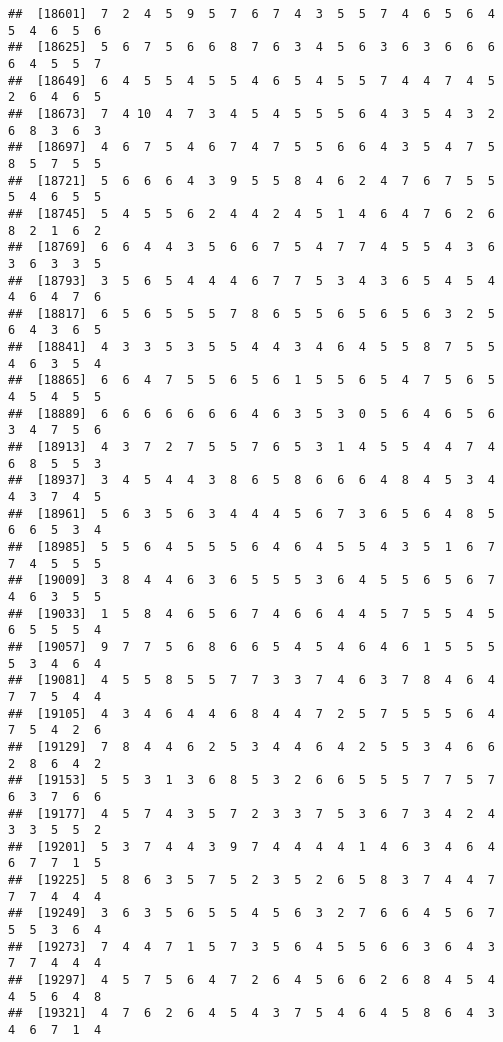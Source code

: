 \documentclass[
]{book}
\begin{document}
\begin{verbatim}
##  [18601]  7  2  4  5  9  5  7  6  7  4  3  5  5  7  4  6  5  6  4  5  4  6  5  6
##  [18625]  5  6  7  5  6  6  8  7  6  3  4  5  6  3  6  3  6  6  6  6  4  5  5  7
##  [18649]  6  4  5  5  4  5  5  4  6  5  4  5  5  7  4  4  7  4  5  2  6  4  6  5
##  [18673]  7  4 10  4  7  3  4  5  4  5  5  5  6  4  3  5  4  3  2  6  8  3  6  3
##  [18697]  4  6  7  5  4  6  7  4  7  5  5  6  6  4  3  5  4  7  5  8  5  7  5  5
##  [18721]  5  6  6  6  4  3  9  5  5  8  4  6  2  4  7  6  7  5  5  5  4  6  5  5
##  [18745]  5  4  5  5  6  2  4  4  2  4  5  1  4  6  4  7  6  2  6  8  2  1  6  2
##  [18769]  6  6  4  4  3  5  6  6  7  5  4  7  7  4  5  5  4  3  6  3  6  3  3  5
##  [18793]  3  5  6  5  4  4  4  6  7  7  5  3  4  3  6  5  4  5  4  4  6  4  7  6
##  [18817]  6  5  6  5  5  5  7  8  6  5  5  6  5  6  5  6  3  2  5  6  4  3  6  5
##  [18841]  4  3  3  5  3  5  5  4  4  3  4  6  4  5  5  8  7  5  5  4  6  3  5  4
##  [18865]  6  6  4  7  5  5  6  5  6  1  5  5  6  5  4  7  5  6  5  4  5  4  5  5
##  [18889]  6  6  6  6  6  6  6  4  6  3  5  3  0  5  6  4  6  5  6  3  4  7  5  6
##  [18913]  4  3  7  2  7  5  5  7  6  5  3  1  4  5  5  4  4  7  4  6  8  5  5  3
##  [18937]  3  4  5  4  4  3  8  6  5  8  6  6  6  4  8  4  5  3  4  4  3  7  4  5
##  [18961]  5  6  3  5  6  3  4  4  4  5  6  7  3  6  5  6  4  8  5  6  6  5  3  4
##  [18985]  5  5  6  4  5  5  5  6  4  6  4  5  5  4  3  5  1  6  7  7  4  5  5  5
##  [19009]  3  8  4  4  6  3  6  5  5  5  3  6  4  5  5  6  5  6  7  4  6  3  5  5
##  [19033]  1  5  8  4  6  5  6  7  4  6  6  4  4  5  7  5  5  4  5  6  5  5  5  4
##  [19057]  9  7  7  5  6  8  6  6  5  4  5  4  6  4  6  1  5  5  5  5  3  4  6  4
##  [19081]  4  5  5  8  5  5  7  7  3  3  7  4  6  3  7  8  4  6  4  7  7  5  4  4
##  [19105]  4  3  4  6  4  4  6  8  4  4  7  2  5  7  5  5  5  6  4  7  5  4  2  6
##  [19129]  7  8  4  4  6  2  5  3  4  4  6  4  2  5  5  3  4  6  6  2  8  6  4  2
##  [19153]  5  5  3  1  3  6  8  5  3  2  6  6  5  5  5  7  7  5  7  6  3  7  6  6
##  [19177]  4  5  7  4  3  5  7  2  3  3  7  5  3  6  7  3  4  2  4  3  3  5  5  2
##  [19201]  5  3  7  4  4  3  9  7  4  4  4  4  1  4  6  3  4  6  4  6  7  7  1  5
##  [19225]  5  8  6  3  5  7  5  2  3  5  2  6  5  8  3  7  4  4  7  7  7  4  4  4
##  [19249]  3  6  3  5  6  5  5  4  5  6  3  2  7  6  6  4  5  6  7  5  5  3  6  4
##  [19273]  7  4  4  7  1  5  7  3  5  6  4  5  5  6  6  3  6  4  3  7  7  4  4  4
##  [19297]  4  5  7  5  6  4  7  2  6  4  5  6  6  2  6  8  4  5  4  4  5  6  4  8
##  [19321]  4  7  6  2  6  4  5  4  3  7  5  4  6  4  5  8  6  4  3  4  6  7  1  4

\end{verbatim}
\end{document}
